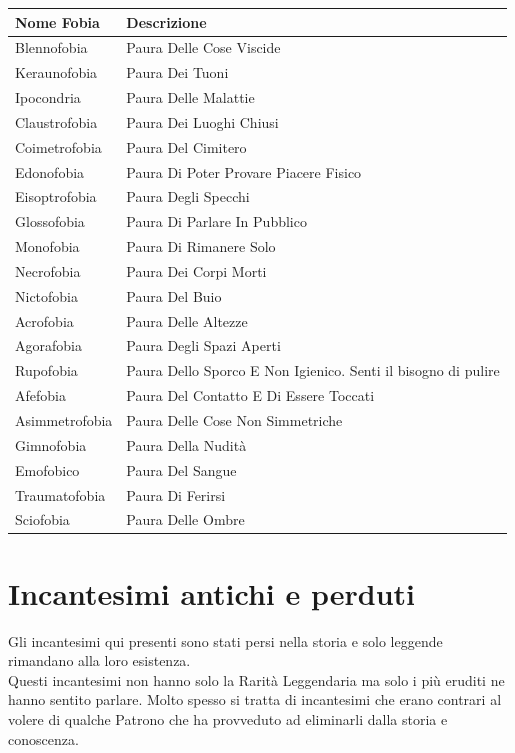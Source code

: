 \documentclass[a4paper,twoside,openany]{book}
\begin{document}
\begin{tabular}{ll}
\textbf{Nome Fobia} & \textbf{Descrizione}\\
\toprule
Blennofobia & Paura Delle Cose Viscide\\
Keraunofobia  & Paura Dei Tuoni\\
Ipocondria  & Paura Delle Malattie\\
Claustrofobia & Paura Dei Luoghi Chiusi\\
Coimetrofobia & Paura Del Cimitero\\
Edonofobia  & Paura Di Poter Provare Piacere Fisico\\
Eisoptrofobia & Paura Degli Specchi\\
Glossofobia & Paura Di Parlare In Pubblico\\
Monofobia & Paura Di Rimanere Solo\\
Necrofobia  & Paura Dei Corpi Morti\\
Nictofobia  & Paura Del Buio\\
Acrofobia & Paura Delle Altezze\\
Agorafobia  & Paura Degli Spazi Aperti\\
Rupofobia & Paura Dello Sporco E Non Igienico. Senti il bisogno di pulire\\
Afefobia  & Paura Del Contatto E Di Essere Toccati\\
Asimmetrofobia  & Paura Delle Cose Non Simmetriche\\
Gimnofobia  & Paura Della Nudità\\
Emofobico & Paura Del Sangue\\
Traumatofobia & Paura Di Ferirsi\\
Sciofobia & Paura Delle Ombre\\
\end{tabular}

\pagebreak

\section{Incantesimi antichi e perduti}

Gli incantesimi qui presenti sono stati persi nella storia e solo leggende rimandano alla loro esistenza.\\
Questi incantesimi non hanno solo la Rarità Leggendaria ma solo i più eruditi ne hanno sentito parlare. Molto spesso si tratta di incantesimi che erano contrari al volere di qualche Patrono che ha provveduto ad eliminarli dalla storia e conoscenza.
\end{document}
